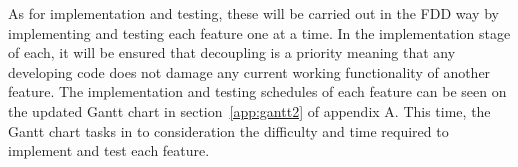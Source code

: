 As for implementation and testing, these will be carried out in the FDD way by implementing and testing each feature one at a time. In the implementation stage of each, it will be ensured that decoupling is a priority meaning that any developing code does not damage any current working functionality of another feature. The implementation and testing schedules of each feature can be seen on the updated Gantt chart in section~\ref{app:gantt2} of appendix A. This time, the Gantt chart tasks in to consideration the difficulty and time required to implement and test each feature.